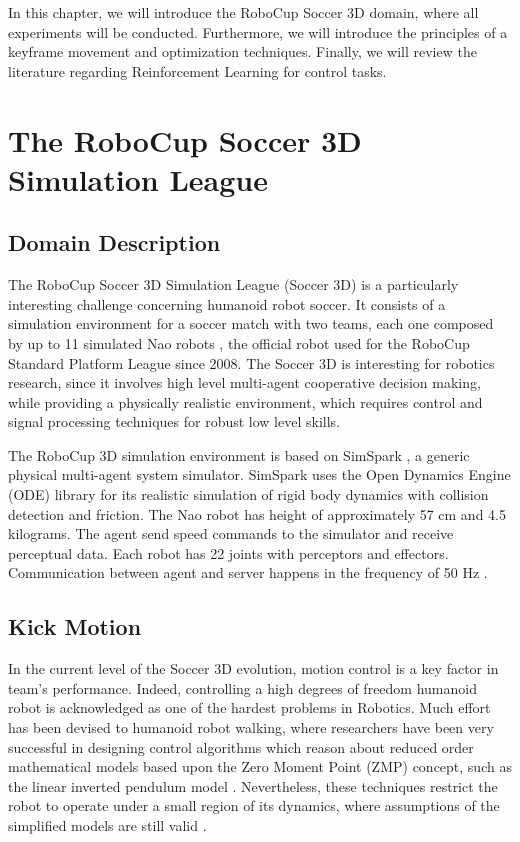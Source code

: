 In this chapter, we will introduce the RoboCup Soccer 3D domain, where all experiments will be conducted. Furthermore, we will introduce the principles of a keyframe movement and optimization techniques. Finally, we will review the literature regarding Reinforcement Learning for control tasks.

\section{The RoboCup Soccer 3D Simulation League}
\subsection{Domain Description}
The RoboCup Soccer 3D Simulation League (Soccer 3D) is a particularly interesting challenge concerning humanoid robot soccer. It consists of a simulation environment for a soccer match with two teams, each one composed by up to 11 simulated Nao robots \cite{gouaillier2009}, the official robot used for the RoboCup Standard Platform League since 2008. The Soccer 3D is interesting for robotics research, since it involves high level multi-agent cooperative decision making, while providing a physically realistic environment, which requires control and signal processing techniques for robust low level skills.

The RoboCup 3D simulation environment is based on SimSpark \cite{simspark}, a generic
physical multi-agent system simulator. SimSpark uses the Open Dynamics Engine (ODE) library for its realistic simulation of rigid body dynamics with
collision detection and friction. The Nao robot has height of approximately 57 cm and 4.5 kilograms. The agent send speed commands to the simulator and receive perceptual data. Each robot has 22 joints with perceptors and effectors. Communication between agent and server happens in the frequency of 50 Hz \cite{AAAI12-MacAlpine}. 

\subsection{ Kick Motion }
In the current level of the Soccer 3D evolution, motion control is a key factor in team's performance. Indeed, controlling a high degrees of freedom humanoid robot is acknowledged as one of the hardest problems in Robotics. Much effort has been devised to humanoid robot walking, where researchers have been very successful in designing control algorithms which reason about reduced order mathematical models based upon the Zero Moment Point (ZMP) concept, such as the linear inverted pendulum model \cite{kajita2001}. Nevertheless, these techniques restrict the robot to operate under a small region of its dynamics, where assumptions of the simplified models are still valid \cite{collins2005,muniz2016}.

